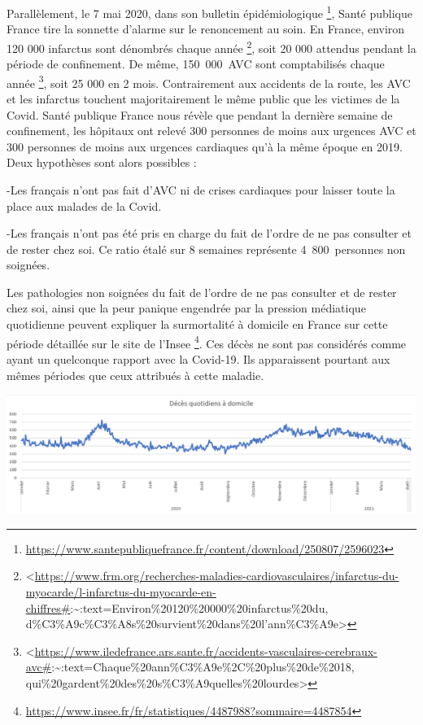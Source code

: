 \documentclass[
]{article}
\begin{document}
Parallèlement, le 7 mai 2020, dans son bulletin épidémiologique
\footnote{\url{https://www.santepubliquefrance.fr/content/download/250807/2596023}},
Santé publique France tire la sonnette d'alarme sur le renoncement au
soin. En France, environ 120 000 infarctus sont dénombrés chaque année
\footnote{\textless{}\url{https://www.frm.org/recherches-maladies-cardiovasculaires/infarctus-du-myocarde/l-infarctus-du-myocarde-en-chiffres\#}:\textasciitilde:text=Environ\%20120\%20000\%20infarctus\%20du,
  d\%C3\%A9c\%C3\%A8s\%20survient\%20dans\%20l'ann\%C3\%A9e\textgreater{}},
soit 20 000 attendus pendant la période de confinement. De même,
150~000~AVC sont comptabilisés chaque année \footnote{\textless{}\url{https://www.iledefrance.ars.sante.fr/accidents-vasculaires-cerebraux-avc\#}:\textasciitilde:text=Chaque\%20ann\%C3\%A9e\%2C\%20plus\%20de\%2018,
  qui\%20gardent\%20des\%20s\%C3\%A9quelles\%20lourdes\textgreater{}},
soit 25 000 en 2 mois. Contrairement aux accidents de la route, les AVC
et les infarctus touchent majoritairement le même public que les
victimes de la Covid. Santé publique France nous révèle que pendant la
dernière semaine de confinement, les hôpitaux ont relevé 300 personnes
de moins aux urgences AVC et 300 personnes de moins aux urgences
cardiaques qu'à la même époque en 2019. Deux hypothèses sont alors
possibles :

-Les français n'ont pas fait d'AVC ni de crises cardiaques pour laisser
toute la place aux malades de la Covid.

-Les français n'ont pas été pris en charge du fait de l'ordre de ne pas
consulter et de rester chez soi. Ce ratio étalé sur 8 semaines
représente 4~800~personnes non soignées.

Les pathologies non soignées du fait de l'ordre de ne pas consulter et
de rester chez soi, ainsi que la peur panique engendrée par la pression
médiatique quotidienne peuvent expliquer la surmortalité à domicile en
France sur cette période détaillée sur le site de l'Insee \footnote{\url{https://www.insee.fr/fr/statistiques/4487988?sommaire=4487854}}.
Ces décès ne sont pas considérés comme ayant un quelconque rapport avec
la Covid-19. Ils apparaissent pourtant aux mêmes périodes que ceux
attribués à cette maladie.

\includegraphics[width=10.41667in,height=\textheight]{data/images/domicile.png}
\end{document}
